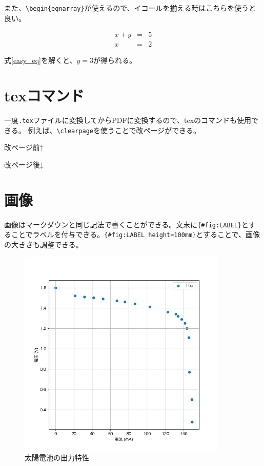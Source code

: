 \documentclass[
]{ltjarticle}
\begin{document}
また、\texttt{\textbackslash{}begin\{eqnarray\}}が使えるので、イコールを揃える時はこちらを使うと良い。

\begin{eqnarray}
x + y &=& 5 \label{easy_eq} \\
x &=& 2
\end{eqnarray}

式\ref{easy_eq}を解くと、\(y = 3\)が得られる。

\hypertarget{texux30b3ux30deux30f3ux30c9}{%
\section{texコマンド}\label{texux30b3ux30deux30f3ux30c9}}

一度\texttt{.tex}ファイルに変換してからPDFに変換するので、texのコマンドも使用できる。
例えば、\texttt{\textbackslash{}clearpage}を使うことで改ページができる。

改ページ前↑

\clearpage

改ページ後↓

\hypertarget{ux753bux50cf}{%
\section{画像}\label{ux753bux50cf}}

画像はマークダウンと同じ記法で書くことができる。文末に\texttt{\{\#fig:LABEL\}}とすることでラベルを付与できる。\texttt{\{\#fig:LABEL\ height=100mm\}}とすることで、画像の大きさも調整できる。

\begin{figure}
\hypertarget{fig:solar}{%
\centering
\includegraphics[width=\textwidth,height=100mm]{solar.png}
\caption{太陽電池の出力特性}\label{fig:solar}
}
\end{figure}
\end{document}
